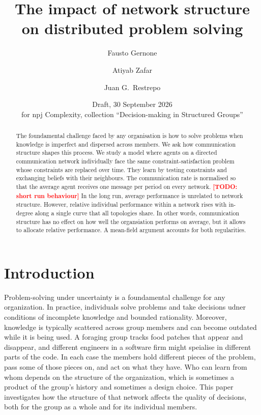 \documentclass[11pt]{article}
\title{The impact of network structure on distributed problem solving}
\author{Fausto Gernone \and Atiyab Zafar \and Juan G.\ Restrepo}
\date{Draft, 30 September 2026\\ \small for npj Complexity, collection ``Decision-making in Structured Groups''}
\newcommand{\todo}[1]{\textcolor{red}{\textbf{[TODO: #1]}}}
\begin{document}
\maketitle


\begin{abstract}
    The foundamental challenge faced by any organisation is how to solve problems when knowledge is imperfect and dispersed across members. We ask how communication structure shapes this process. We study a model where agents on a directed communication network individually face the same constraint-satisfaction problem whose constraints are replaced over time. They learn by testing constraints and exchanging beliefs with their neighbours. The communication rate is normalised so that the average agent receives one message per period on every network. \todo{short run behaviour} In the long run, average performance is unrelated to network structure. However, relative individual performance within a network rises with in-degree along a single curve that all topologies share. In other words, communication structure has no effect on how well the organsiation performs on average, but it allows to allocate relative performance. A mean-field argument accounts for both regularities.
\end{abstract}


\section{Introduction}\label{sec:intro}

Problem-solving under uncertainty is a foundamental challenge for any organization. In practice, individuals solve problems and take decisions udner conditions of incomplete knowledge and bounded rationality. Moreover, knowledge is typically scattered across group members and can become outdated while it is being used. A foraging group tracks food patches that appear and disappear, and different engineers in a software firm might speialise in different parts of the code. In each case the members hold different pieces of the problem, pass some of those pieces on, and act on what they have. Who can learn from whom depends on the structure of the organization, which is sometimes a product of the group's history and sometimes a design choice. This paper investigates how the structure of that network affects the quality of decisions, both for the group as a whole and for its individual members.
\end{document}
